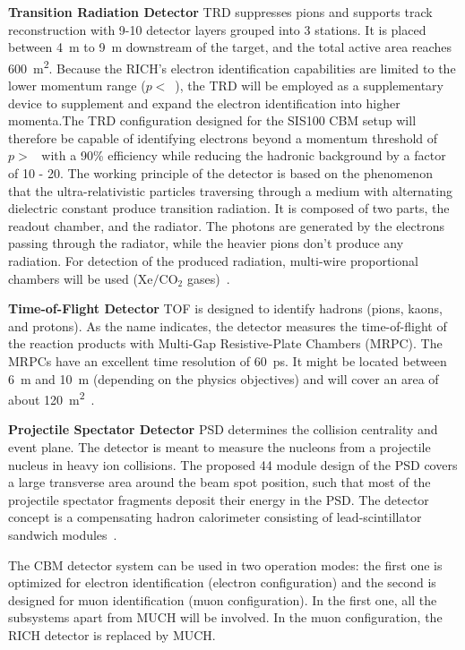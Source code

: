 \textbf{Transition Radiation Detector} \gls{TRD} suppresses pions and  supports track reconstruction with 9-10 detector layers grouped into 3 stations. It is placed between \SI{4}{\metre} to \SI{9}{\metre} downstream of the target, and the total active area reaches \SI{600}{\square\metre}. Because the RICH's electron identification capabilities are limited to the lower momentum range ($p < $~), the TRD will be employed as a supplementary device to supplement and expand the electron identification into higher momenta.The TRD configuration designed for the SIS100 CBM setup will therefore be capable of identifying electrons beyond a momentum threshold of $p > $~ with a 90\% efficiency while reducing the hadronic background by a factor of 10 - 20. The working principle of the detector is based on the phenomenon that the ultra-relativistic particles traversing through a medium with alternating dielectric constant produce transition radiation. It is composed of two parts, the readout chamber, and the radiator. The photons are generated by the electrons passing through the radiator, while the heavier pions don't produce any radiation. For detection of the produced radiation, multi-wire proportional chambers will be used ($\mathrm{Xe/CO_{2}}$ gases)~\cite{TRD}. \bigbreak

\textbf{Time-of-Flight Detector} \gls{TOF} is designed to identify hadrons (pions, kaons, and protons). As the name indicates, the detector measures the time-of-flight of the reaction products with Multi-Gap Resistive-Plate Chambers (\gls{MRPC}). The \glspl{MRPC} have an excellent time resolution of \SI{60}{\pico\second}.  It might be located between \SI{6}{\metre} and \SI{10}{\metre} (depending on the physics objectives) and will cover an area of about \SI{120}{\square\metre}~\cite{TOF}. \bigbreak

\textbf{Projectile Spectator Detector} \gls{PSD} determines the collision centrality and event plane. The detector is meant to measure the nucleons from a projectile nucleus in heavy ion collisions. The proposed 44 module design of the PSD covers a large transverse area around the beam spot position, such that most of the projectile spectator fragments deposit their energy in the \gls{PSD}. The detector concept is a compensating hadron calorimeter consisting of lead-scintillator sandwich modules~\cite{PSD}.\bigbreak


The CBM detector system can be used in two operation modes: the first one is optimized for electron identification (electron configuration) and the second is designed for muon identification (muon configuration). In the first one, all the subsystems apart from MUCH will be involved. In the muon configuration, the \gls{RICH} detector is replaced by \gls{MUCH}.

